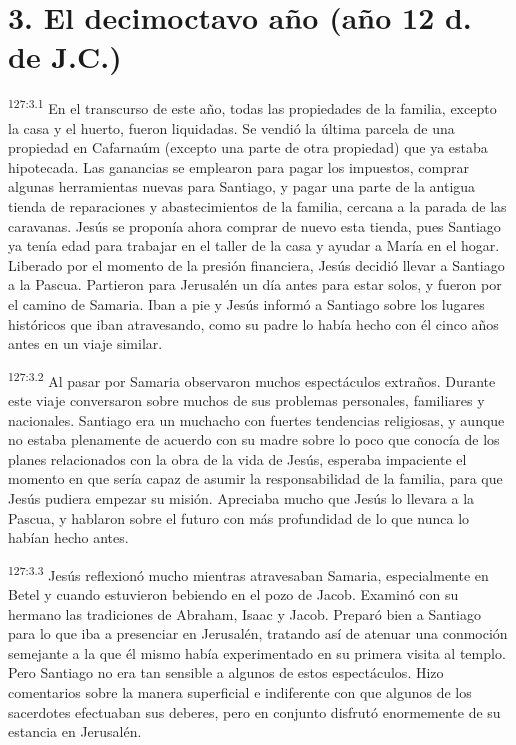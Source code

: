 \section*{3. El decimoctavo año (año 12 d. de J.C.)}
\par 
\textsuperscript{127:3.1} En el transcurso de este año, todas las propiedades de la familia, excepto la casa y el huerto, fueron liquidadas. Se vendió la última parcela de una propiedad en Cafarnaúm (excepto una parte de otra propiedad) que ya estaba hipotecada. Las ganancias se emplearon para pagar los impuestos, comprar algunas herramientas nuevas para Santiago, y pagar una parte de la antigua tienda de reparaciones y abastecimientos de la familia, cercana a la parada de las caravanas. Jesús se proponía ahora comprar de nuevo esta tienda, pues Santiago ya tenía edad para trabajar en el taller de la casa y ayudar a María en el hogar. Liberado por el momento de la presión financiera, Jesús decidió llevar a Santiago a la Pascua. Partieron para Jerusalén un día antes para estar solos, y fueron por el camino de Samaria. Iban a pie y Jesús informó a Santiago sobre los lugares históricos que iban atravesando, como su padre lo había hecho con él cinco años antes en un viaje similar.

\par 
\textsuperscript{127:3.2} Al pasar por Samaria observaron muchos espectáculos extraños. Durante este viaje conversaron sobre muchos de sus problemas personales, familiares y nacionales. Santiago era un muchacho con fuertes tendencias religiosas, y aunque no estaba plenamente de acuerdo con su madre sobre lo poco que conocía de los planes relacionados con la obra de la vida de Jesús, esperaba impaciente el momento en que sería capaz de asumir la responsabilidad de la familia, para que Jesús pudiera empezar su misión. Apreciaba mucho que Jesús lo llevara a la Pascua, y hablaron sobre el futuro con más profundidad de lo que nunca lo habían hecho antes.

\par 
\textsuperscript{127:3.3} Jesús reflexionó mucho mientras atravesaban Samaria, especialmente en Betel y cuando estuvieron bebiendo en el pozo de Jacob. Examinó con su hermano las tradiciones de Abraham, Isaac y Jacob. Preparó bien a Santiago para lo que iba a presenciar en Jerusalén, tratando así de atenuar una conmoción semejante a la que él mismo había experimentado en su primera visita al templo. Pero Santiago no era tan sensible a algunos de estos espectáculos. Hizo comentarios sobre la manera superficial e indiferente con que algunos de los sacerdotes efectuaban sus deberes, pero en conjunto disfrutó enormemente de su estancia en Jerusalén.


